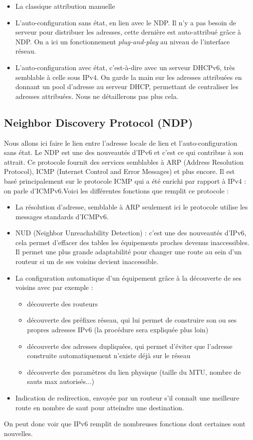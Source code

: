 \begin{itemize}
\item La classique attribution manuelle\item L’auto-configuration sans état, en lien avec le NDP. Il n’y a pas besoin de serveur pour distribuer les adresses, cette dernière est auto-attribué grâce à NDP. On a ici un fonctionnement \emph{plug-and-play} au niveau de l’interface réseau.\item L’auto-configuration avec état, c’est-à-dire avec un serveur DHCPv6, très semblable à celle sous IPv4. On garde la main sur les adresses attribuées en donnant un pool d’adresse au serveur DHCP, permettant de centraliser les adresses attribuées. Nous ne détaillerons pas plus cela.
\end{itemize}

\subsection{Neighbor Discovery Protocol (NDP)}

Nous allons ici faire le lien entre l’adresse locale de lien et l’auto-configuration sans état.
Le NDP est une des nouveautés d’IPv6 et c’est ce qui contribue à son attrait. Ce protocole fournit des services semblables à ARP (Address Resolution Protocol), ICMP (Internet Control and Error Messages) et plus encore. Il est basé principalement sur le protocole ICMP qui a été enrichi par rapport à IPv4 : on parle d’ICMPv6.Voici les différentes fonctions que remplit ce protocole :
\begin{itemize}
\item La résolution d’adresse, semblable à ARP seulement ici le protocole utilise les messages standards d’ICMPv6.\item NUD (Neighbor Unreachability Detection) : c’est une des nouveautés d’IPv6, cela permet d’effacer des tables les équipements proches devenus inaccessibles. Il permet une plus grande adaptabilité pour changer une route au sein d’un routeur si un de ses voisins devient inaccessible.\item La configuration automatique d’un équipement grâce à la découverte de ses voisins avec par exemple :
\begin{itemize}
\item découverte des routeurs\item découverte des préfixes réseau, qui lui permet de construire son ou ses propres adresses IPv6 (la procédure sera expliquée plus loin)
\item découverte des adresses dupliquées, qui permet d’éviter que l’adresse construite automatiquement n’existe déjà sur le réseau\item découverte des paramètres du lien physique (taille du MTU, nombre de sauts max autorisés...)
\end{itemize}
\item	Indication de redirection, envoyée par un routeur s’il connaît une meilleure route en nombre de saut pour atteindre une destination.
\end{itemize}On peut donc voir que IPv6 remplit de nombreuses fonctions dont certaines sont nouvelles.

